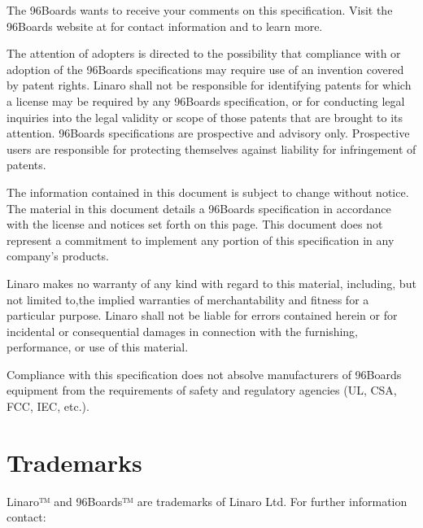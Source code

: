 \documentclass[a4paper,10pt,oneside,english]{sphinxmanual}
\begin{document}
\sphinxAtStartPar
The 96Boards wants to receive your comments on this specification. Visit the 96Boards website at  for contact information and to learn more.

\sphinxAtStartPar
The attention of adopters is directed to the possibility that compliance with or adoption of the 96Boards specifications may require use of an invention covered by patent rights. Linaro shall not be responsible for identifying patents for which a license may be required by any 96Boards specification, or for conducting legal inquiries into the legal validity or scope of those patents that are brought to its attention. 96Boards specifications are prospective and advisory only. Prospective users are responsible for protecting themselves against liability for infringement of patents.

\sphinxAtStartPar
The information contained in this document is subject to change without notice. The material in this document details a 96Boards specification in accordance with the license and notices set forth on this page. This document does not represent a commitment to implement any portion of this specification in any company’s products.

\sphinxAtStartPar
Linaro makes no warranty of any kind with regard to this material, including, but not limited to,the implied warranties of merchantability and fitness for a particular purpose. Linaro shall not be liable for errors contained herein or for incidental or consequential damages in connection with the furnishing, performance, or use of this material.

\sphinxAtStartPar
Compliance with this specification does not absolve manufacturers of 96Boards equipment from the requirements of safety and regulatory agencies (UL, CSA, FCC, IEC, etc.).


\section{Trademarks}
\label{\detokenize{chapter1-ce:trademarks}}
\sphinxAtStartPar
Linaro™ and 96Boards™ are trademarks of Linaro Ltd.
For further information contact: 
\end{document}
